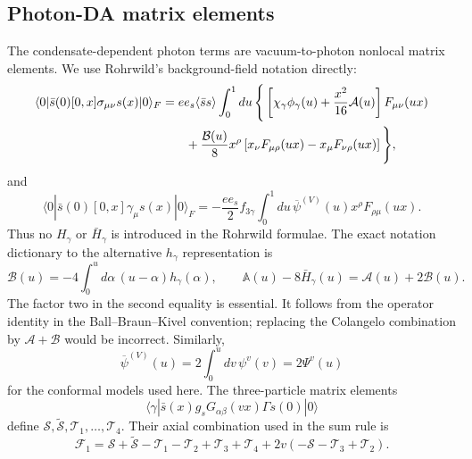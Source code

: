 \documentclass[11pt]{article}
\begin{document}
\subsection{Photon-DA matrix elements}

The condensate-dependent photon terms are vacuum-to-photon nonlocal matrix
elements.  We use Rohrwild's background-field notation directly:
\begin{align}
  \langle0|\bar s(0)[0,x]\sigma_{\mu\nu}s(x)|0\rangle_F
  ={}&e e_s\langle\bar ss\rangle\int_0^1du\,
  \Bigg\{
  \left[\chi_\gamma\phi_\gamma(u)
        +\frac{x^2}{16}\mathcal A(u)\right]F_{\mu\nu}(ux)
  \nonumber\\
  &\hspace{0.2cm}
  +\frac{\mathcal B(u)}{8}x^\rho
  \left[x_\nu F_{\mu\rho}(ux)-x_\mu F_{\nu\rho}(ux)\right]
  \Bigg\},
  \label{eq:tensor-photon-da}
\end{align}
and
\begin{equation}
  \langle0|\bar s(0)[0,x]\gamma_\mu s(x)|0\rangle_F
  =-\frac{e e_s}{2}f_{3\gamma}
  \int_0^1du\,\overline\psi^{(V)}(u)x^\rho F_{\rho\mu}(ux).
  \label{eq:vector-photon-da}
\end{equation}
Thus no $H_\gamma$ or $\bar H_\gamma$ is introduced in the Rohrwild
formulae.  The exact notation dictionary to the alternative $h_\gamma$
representation is
\begin{equation}
 \boxed{\mathcal B(u)
 =-4\int_0^u d\alpha\,(u-\alpha)h_\gamma(\alpha)},\qquad
 \mathbb A(u)-8\bar H_\gamma(u)
 =\mathcal A(u)+2\mathcal B(u).
 \label{eq:rohrwild-B-dictionary}
\end{equation}
The factor two in the second equality is essential.  It follows from the
operator identity in the Ball--Braun--Kivel convention; replacing the
Colangelo combination by $\mathcal A+\mathcal B$ would be incorrect.
Similarly,
\begin{equation}
 \overline\psi^{(V)}(u)=2\int_0^u dv\,\psi^v(v)
 =2\Psi^v(u)
 \label{eq:rohrwild-vector-dictionary}
\end{equation}
for the conformal models used here.  The three-particle matrix elements
\[
 \langle\gamma|\bar s(x)g_sG_{\alpha\beta}(vx)\Gamma s(0)|0\rangle
\]
define $\mathcal S,\widetilde{\mathcal S},\mathcal T_1,\ldots,\mathcal T_4$.
Their axial combination used in the sum rule is
\begin{equation}
  \mathcal F_1=
  \mathcal S+\widetilde{\mathcal S}-\mathcal T_1-\mathcal T_2
  +\mathcal T_3+\mathcal T_4
  +2v(-\mathcal S-\mathcal T_3+\mathcal T_2).
  \label{eq:F1-combination}
\end{equation}
\end{document}

